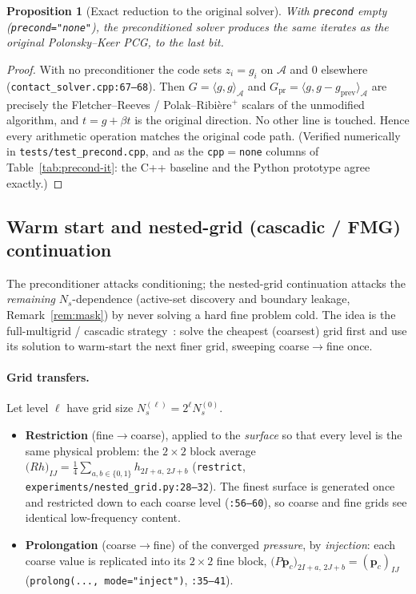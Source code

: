 \documentclass[11pt,a4paper]{article}
\newcommand{\pp}{\mathbf{p}}
\newcommand{\code}[1]{\texttt{#1}}
\newtheorem{proposition}{Proposition}
\theoremstyle{definition}
\theoremstyle{remark}
\begin{document}
\begin{proposition}[Exact reduction to the original solver]
\label{prop:precond-none}
With \code{precond} empty (\code{precond="none"}), the preconditioned solver
produces the \emph{same} iterates as the original Polonsky--Keer PCG, to the last
bit.
\end{proposition}
\begin{proof}
With no preconditioner the code sets $z_i=g_i$ on $\mathcal A$ and $0$ elsewhere
(\code{contact\_solver.cpp:67--68}). Then $G=\langle g,g\rangle_{\mathcal A}$ and
$G_{\text{pr}}=\langle g,g-g_{\text{prev}}\rangle_{\mathcal A}$ are precisely the
Fletcher--Reeves / Polak--Ribière$^+$ scalars of the unmodified algorithm, and
$t=g+\beta t$ is the original direction. No other line is touched. Hence every
arithmetic operation matches the original code path. (Verified numerically in
\code{tests/test\_precond.cpp}, and as the \code{cpp}$=$\code{none} columns of
Table~\ref{tab:precond-it}: the C++ baseline and the Python prototype agree
exactly.)
\end{proof}

\subsection{Warm start and nested-grid (cascadic / FMG) continuation}
\label{sec:nested}

The preconditioner attacks conditioning; the nested-grid continuation attacks the
\emph{remaining} $N_s$-dependence (active-set discovery and boundary leakage,
Remark~\ref{rem:mask}) by never solving a hard fine problem cold. The idea is the
full-multigrid / cascadic strategy~\cite{Brandt1977,BornemannDeuflhard1996}: solve
the cheapest (coarsest) grid first and use its solution to warm-start the next
finer grid, sweeping coarse$\to$fine once.

\paragraph{Grid transfers.}
Let level $\ell$ have grid size $N_s^{(\ell)}=2^{\ell}N_s^{(0)}$.
\begin{itemize}
\item \textbf{Restriction} (fine$\to$coarse), applied to the \emph{surface} so
that every level is the same physical problem: the $2\times2$ block average
$\big(R h\big)_{IJ}=\tfrac14\sum_{a,b\in\{0,1\}}h_{2I+a,\,2J+b}$
(\code{restrict}, \code{experiments/nested\_grid.py:28--32}). The finest surface
is generated once and restricted down to each coarse level (\code{:56--60}), so
coarse and fine grids see identical low-frequency content.
\item \textbf{Prolongation} (coarse$\to$fine) of the converged \emph{pressure},
by \emph{injection}: each coarse value is replicated into its $2\times2$ fine
block, $\big(P\pp_c\big)_{2I+a,\,2J+b}=(\pp_c)_{IJ}$
(\code{prolong(..., mode="inject")}, \code{:35--41}).
\end{itemize}
\end{document}

